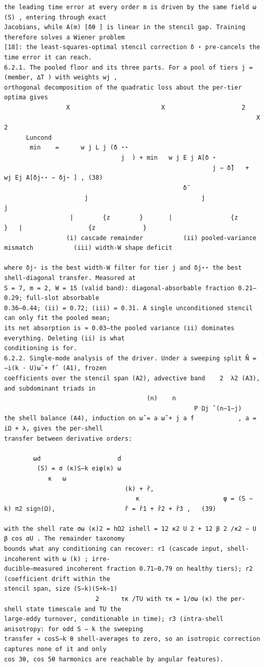 \documentclass[letterpaper]{article}
\begin{document}
\begin{Verbatim}[fontsize=\fontsize{6.35}{7.15}\selectfont,breaklines=false]
the leading time error at every order m is driven by the same field ω (S) , entering through exact
Jacobians, while A(m) [δθ ] is linear in the stencil gap. Training therefore solves a Wiener problem
[18]: the least-squares-optimal stencil correction δ ⋆ pre-cancels the time error it can reach.
6.2.1. The pooled floor and its three parts. For a pool of tiers j = (member, ∆T ) with weights wj ,
orthogonal decomposition of the quadratic loss about the per-tier optima gives
                 X                         X                     2
                                                                     X                      2
      Luncond
       min    =      w j L j (δ ⋆⋆
                                j  ) + min   w j E j A[δ ⋆
                                                         j − δ̄]   +   wj Ej A[δj⋆⋆ − δj⋆ ] , (38)
                                                 δ̄
                      j                               j                                  j
                  |        {z        }       |                {z                 }   |                  {z             }
                 (i) cascade remainder           (ii) pooled-variance mismatch           (iii) width-W shape deficit

where δj⋆ is the best width-W filter for tier j and δj⋆⋆ the best shell-diagonal transfer. Measured at
S = 7, m = 2, W = 15 (valid band): diagonal-absorbable fraction 0.21–0.29; full-slot absorbable
0.36–0.44; (ii) = 0.72; (iii) = 0.31. A single unconditioned stencil can only fit the pooled mean;
its net absorption is ≈ 0.03—the pooled variance (ii) dominates everything. Deleting (ii) is what
conditioning is for.
6.2.2. Single-mode analysis of the driver. Under a sweeping split N̂ = −i(k · U)ω̂ + fˆ (A1), frozen
coefficients over the stencil span (A2), advective band    2  λ2 (A3), and subdominant triads in
                                       (n)    n
                                                    P Ωj ˆ(n−1−j)
the shell balance (A4), induction on ω̂ = a ω̂ + j a f            , a = iΩ + λ, gives the per-shell
transfer between derivative orders:

        ωd                     d
         (S) = σ (κ)S−k eiφ(κ) ω
            κ   ω
                                 (k) + r̂,
                                    κ                       φ = (S − k) π2 sign(Ω),                   r̂ = r̂1 + r̂2 + r̂3 ,   (39)

with the shell rate σω (κ)2 = hΩ2 ishell = 12 κ2 U 2 + 12 β 2 /κ2 − U β cos αU . The remainder taxonomy
bounds what any conditioning can recover: r1 (cascade input, shell-incoherent with ω (k) ; irre-
ducible—measured incoherent fraction 0.71–0.79 on healthy tiers); r2 (coefficient drift within the
stencil span, size (S−k)(S+k−1)
                         2      τκ /TU with τκ = 1/σω (κ) the per-shell state timescale and TU the
large-eddy turnover, conditionable in time); r3 (intra-shell anisotropy: for odd S − k the sweeping
transfer ∝ cosS−k θ shell-averages to zero, so an isotropic correction captures none of it and only
cos 3θ, cos 5θ harmonics are reachable by angular features).


\end{Verbatim}
\end{document}
